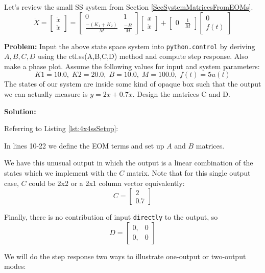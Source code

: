 \begin{ExampleSmall}
    Let's review the small SS system from Section \ref{SecSystemMatricesFromEOMs}.
    \[
    \dot{X} =
    \begin{bmatrix}\dot{x} \\ \ddot{x} \end{bmatrix} =
    \begin{bmatrix}0&1\\\frac{-(K_1+K_2)}{M}&\frac{-B}{M}\end{bmatrix}
    \begin{bmatrix}x\\ \dot{x}\end{bmatrix}+
    \begin{bmatrix}0&\frac{1}{M}\end{bmatrix}
    \begin{bmatrix}0\\f(t)\end{bmatrix}
    \]

{\bf Problem: }  Input the above state space system into {\tt python.control}
by deriving $A,B,C,D$ using the
ctl.ss(A,B,C,D) method
and compute step response. Also make a phase plot.   Assume the following
values for input and system parameters:
\[
    K1 = 10.0, \;  K2 = 20.0,\; B = 10.0,\; M = 100.0,\;
    f(t) = 5u(t)
\]
The states of our system are inside some kind of opaque box such that the output
we can actually measure
is $y = 2x+0.7\dot{x}$.   Design the
matrices C and D.

\noindent
{\bf Solution:}

Referring to Listing \ref{lst:4x4ssSetup}:

In lines 10-22 we define the EOM terms and set up $A$ and $B$ matrices.

We have this unusual output in which the output is a linear combination
of the states which we implement with the $C$ matrix.
Note that for this single output case, $C$ could be 2x2 or a 2x1 column vector
equivalently:
\[
C = \begin{bmatrix} 2 \\ 0.7 \end{bmatrix}
\]


Finally,
there is no contribution of input {\tt directly} to the output, so
\[
D= \begin{bmatrix} 0,&0\\0,&0 \end{bmatrix}
\]

We will do the step response two ways to illustrate one-output or two-output modes:


\end{ExampleSmall}
